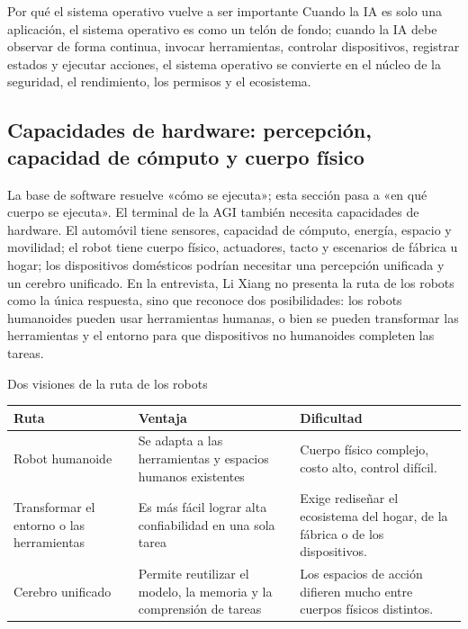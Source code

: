 \begin{importantbox}{Por qué el sistema operativo vuelve a ser importante}
Cuando la IA es solo una aplicación, el sistema operativo es como un telón de fondo; cuando la IA debe observar de forma continua, invocar herramientas, controlar dispositivos, registrar estados y ejecutar acciones, el sistema operativo se convierte en el núcleo de la seguridad, el rendimiento, los permisos y el ecosistema.
\end{importantbox}

\subsection{Capacidades de hardware: percepción, capacidad de cómputo y cuerpo físico}

La base de software resuelve «cómo se ejecuta»; esta sección pasa a «en qué cuerpo se ejecuta». El terminal de la AGI también necesita capacidades de hardware. El automóvil tiene sensores, capacidad de cómputo, energía, espacio y movilidad; el robot tiene cuerpo físico, actuadores, tacto y escenarios de fábrica u hogar; los dispositivos domésticos podrían necesitar una percepción unificada y un cerebro unificado. En la entrevista, Li Xiang no presenta la ruta de los robots como la única respuesta, sino que reconoce dos posibilidades: los robots humanoides pueden usar herramientas humanas, o bien se pueden transformar las herramientas y el entorno para que dispositivos no humanoides completen las tareas.

\begin{knowledgebox}{Dos visiones de la ruta de los robots}
\begin{tabularx}{\textwidth}{p{}p{}X}
\toprule
Ruta & Ventaja & Dificultad \\
\midrule
Robot humanoide & Se adapta a las herramientas y espacios humanos existentes & Cuerpo físico complejo, costo alto, control difícil. \\
Transformar el entorno o las herramientas & Es más fácil lograr alta confiabilidad en una sola tarea & Exige rediseñar el ecosistema del hogar, de la fábrica o de los dispositivos. \\
Cerebro unificado & Permite reutilizar el modelo, la memoria y la comprensión de tareas & Los espacios de acción difieren mucho entre cuerpos físicos distintos. \\
\bottomrule
\end{tabularx}
\end{knowledgebox}

